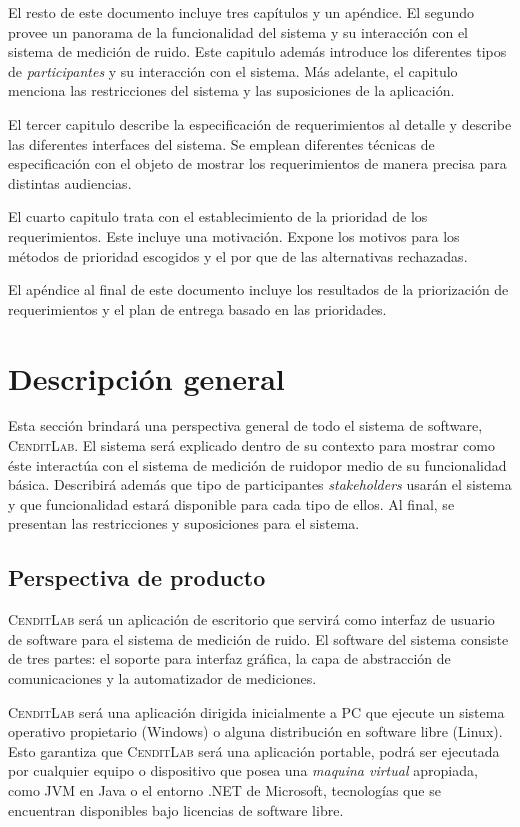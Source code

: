 \documentclass[paper=a4,oneside,fontsize=12pt]{article}
\newcommand{\AppName}{\textsc{CenditLab}\xspace}
\newcommand{\smr}{sistema de medición de ruido}
\begin{document}
	El resto de este documento incluye tres capítulos y un apéndice. El segundo provee un panorama de la funcionalidad del sistema y su interacción con el \smr. Este capitulo además introduce los diferentes tipos de \emph{participantes} y su interacción con el sistema. Más adelante, el capitulo menciona las restricciones del sistema y las suposiciones de la aplicación.
	
	El tercer capitulo describe la especificación de requerimientos al detalle y describe las diferentes interfaces del sistema. Se emplean diferentes técnicas de especificación con el objeto de mostrar los requerimientos de manera precisa para distintas audiencias.
	
	El cuarto capitulo trata con el establecimiento de la prioridad de los requerimientos. Este incluye una motivación. Expone los motivos para los métodos de prioridad escogidos y el por que de las alternativas rechazadas.  
	
	El apéndice al final de este documento incluye los resultados de la priorización de requerimientos y el plan de entrega basado en las prioridades.
	
	\section{Descripción general}
	
	Esta sección brindará una perspectiva general de todo el sistema de software, \AppName. El sistema será explicado dentro de su contexto para mostrar como éste interactúa con el \smr por medio de su funcionalidad básica. Describirá además que tipo de participantes \textendash \emph{stakeholders} \textendash usarán el sistema y que funcionalidad estará disponible para cada tipo de ellos. Al final, se presentan las restricciones y suposiciones para el sistema.
	
	\subsection{Perspectiva de producto}
	
	\AppName será un aplicación de escritorio que servirá como interfaz de usuario de software para el \smr. El software del sistema consiste de tres partes: el soporte para interfaz gráfica, la capa de abstracción de comunicaciones y la automatizador de mediciones.
	
	\AppName será una aplicación dirigida inicialmente a PC que ejecute un sistema operativo propietario (Windows) o alguna distribución en software libre (Linux). Esto garantiza que \AppName será una aplicación portable, podrá ser ejecutada por cualquier equipo o dispositivo que posea una \emph{maquina virtual} apropiada, como JVM en Java o el entorno .NET de Microsoft, tecnologías que se encuentran disponibles bajo licencias de software libre.
	
\end{document}
